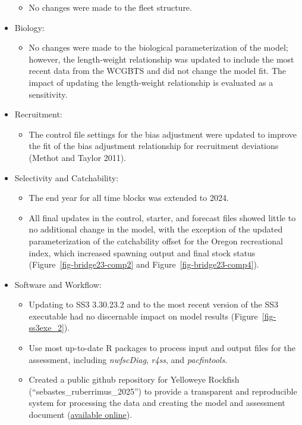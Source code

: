 \documentclass[
]{scrartcl}
\providecommand{\tightlist}{%
  \setlength{\itemsep}{0pt}\setlength{\parskip}{0pt}}\usepackage{longtable,booktabs,array}
\begin{document}
\begin{itemize}
  \begin{itemize}
  \tightlist
  \item
    No changes were made to the fleet structure.
  \end{itemize}
\item
  Biology:

  \begin{itemize}
  \tightlist
  \item
    No changes were made to the biological parameterization of the
    model; however, the length-weight relationship was updated to
    include the most recent data from the WCGBTS and did not change the
    model fit. The impact of updating the length-weight relationship is
    evaluated as a sensitivity.
  \end{itemize}
\item
  Recruitment:

  \begin{itemize}
  \tightlist
  \item
    The control file settings for the bias adjustment were updated to
    improve the fit of the bias adjustment relationship for recruitment
    deviations (Methot and Taylor 2011).
  \end{itemize}
\item
  Selectivity and Catchability:

  \begin{itemize}
  \tightlist
  \item
    The end year for all time blocks was extended to 2024.
  \item
    All final updates in the control, starter, and forecast files showed
    little to no additional change in the model, with the exception of
    the updated parameterization of the catchability offset for the
    Oregon recreational index, which increased spawning output and final
    stock status (Figure~\ref{fig-bridge23-comp2} and
    Figure~\ref{fig-bridge23-comp4}).
  \end{itemize}
\item
  Software and Workflow:

  \begin{itemize}
  \tightlist
  \item
    Updating to SS3 3.30.23.2 and to the most recent version of the SS3
    executable had no discernable impact on model results
    (Figure~\ref{fig-ss3exe_2}).
  \item
    Use most up-to-date R packages to process input and output files for
    the assessment, including \emph{nwfscDiag}, \emph{r4ss}, and
    \emph{pacfintools}.
  \item
    Created a public github repository for Yelloweye Rockfish
    (``sebastes\_ruberrimus\_2025'') to provide a transparent and
    reproducible system for processing the data and creating the model
    and assessment document
    (\href{https://github.com/rclairer/Sebastes_ruberrimus_2025}{available
    online}).
  \end{itemize}
\end{itemize}
\end{document}
